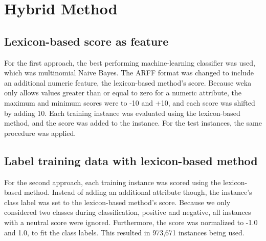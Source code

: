 \section{Hybrid Method}

\subsection{Lexicon-based score as feature}
For the first approach, the best performing machine-learning classifier was used, which was multinomial Naive Bayes. The ARFF format was changed to include an additional numeric feature, the lexicon-based method's score. Because weka only allows values greater than or equal to zero for a numeric attribute, the maximum and minimum scores were  to -10 and +10, and each score was shifted by adding 10. Each training instance was evaluated using the lexicon-based method, and the score was added to the instance. For the test instances, the same procedure was applied.
\subsection{Label training data with lexicon-based method}
For the second approach, each training instance was scored using the lexicon-based method. Instead of adding an additional attribute though, the instance's class label was set to the lexicon-based method's score. Because we only considered two classes during classification, positive and negative, all instances with a neutral score were ignored. Furthermore, the score was normalized to -1.0 and 1.0, to fit the class labels. This resulted in 973,671 instances being used.



